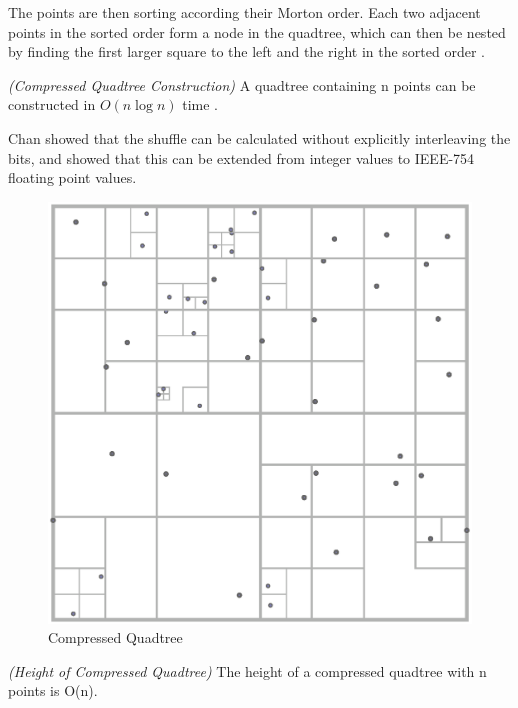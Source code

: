 \documentclass[mcs]{scsthesis}
\begin{document}
The points are then sorting according their Morton order. Each two adjacent
points in the sorted order form a node in the quadtree, which can then be
nested by finding the first larger square to the left and the right in the
sorted order \cite{bern}.

\begin{thm} \emph{(Compressed Quadtree Construction)}
A quadtree containing n points can be constructed in \(O(n \log n)\) time
\cite{bern}.
\end{thm}

Chan \cite{chan} showed that the shuffle can be calculated without explicitly
interleaving the bits, and \cite{connor} showed that this can be extended from
integer values to IEEE-754 floating point values.

\begin{figure}
\begin{center}
\includegraphics[scale=0.4]{diagrams/compressed_quadtree.eps}
\caption{Compressed Quadtree}
\end{center}
\end{figure}

\begin{thm} \emph{(Height of Compressed Quadtree)}
The height of a compressed quadtree with n points is O(n).
\end{thm}
\end{document}
